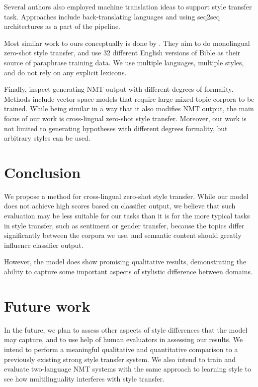 \documentclass[11pt,a4paper]{article}
\begin{document}
Several authors also employed machine translation ideas to support style transfer task. Approaches include back-translating languages \cite{mt-backtrans} and using seq2seq architectures \cite{mt-seq2seq} as a part of the pipeline. 

Most similar work to ours conceptually is done by \citet{rnns-zeroshot}. They aim to do monolingual zero-shot style transfer, and use 32 different English versions of Bible as their source of paraphrase training data. We use multiple languages, multiple styles, and do not rely on any explicit lexicons. 

Finally, \citet{formality} inspect generating NMT output with different degrees of formality. Methods include vector space models that require large mixed-topic corpora to be trained. While being similar in a way that it also modifies NMT output, the main focus of our work is cross-lingual zero-shot style transfer. Moreover, our work is not limited to generating hypotheses with different degrees formality, but arbitrary styles can be used.

\section{Conclusion}
\label{sec:conclusion}

We propose a method for cross-lingual zero-shot style transfer. While our model does not achieve high scores based on classifier output, we believe that such evaluation may be less suitable for our tasks than it is for the more typical tasks in style transfer, such as sentiment or gender transfer, because the topics differ significantly between the corpora we use, and semantic content should greatly influence classifier output.

However, the model does show promising qualitative results, demonstrating the ability to capture some important aspects of stylistic difference between domains.

\section{Future work}
\label{sec:future}

In the future, we plan to assess other aspects of style differences that the model may capture, and to use help of human evaluators in assessing our results. We intend to perform a meaningful qualitative and quantitative comparison to a previously existing strong style transfer system. We also intend to train and evaluate two-language NMT systems with the same approach to learning style to see how multilinguality interferes with style transfer.
\end{document}
